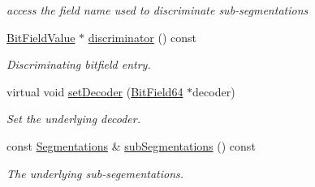\begin{DoxyCompactItemize}
\begin{DoxyCompactList}\small\item\em access the field name used to discriminate sub-\/segmentations \item\end{DoxyCompactList}\item 
\hyperlink{class_d_d4hep_1_1_d_d_segmentation_1_1_bit_field_value}{BitFieldValue} $\ast$ \hyperlink{class_d_d4hep_1_1_d_d_segmentation_1_1_multi_segmentation_a4dbbd970a59a21ac2da3b83ab2782d95}{discriminator} () const 
\begin{DoxyCompactList}\small\item\em Discriminating bitfield entry. \item\end{DoxyCompactList}\item 
virtual void \hyperlink{class_d_d4hep_1_1_d_d_segmentation_1_1_multi_segmentation_a21a046717c1aae25d103dddeb2829cb9}{setDecoder} (\hyperlink{class_d_d4hep_1_1_d_d_segmentation_1_1_bit_field64}{BitField64} $\ast$decoder)
\begin{DoxyCompactList}\small\item\em Set the underlying decoder. \item\end{DoxyCompactList}\item 
const \hyperlink{class_d_d4hep_1_1_d_d_segmentation_1_1_multi_segmentation_a083ba7cc081c5c3c47cafac5980100f8}{Segmentations} \& \hyperlink{class_d_d4hep_1_1_d_d_segmentation_1_1_multi_segmentation_a8a5a0095cb0f92224d1e221449cdcad8}{subSegmentations} () const 
\begin{DoxyCompactList}\small\item\em The underlying sub-\/segementations. \item\end{DoxyCompactList}\end{DoxyCompactItemize}
